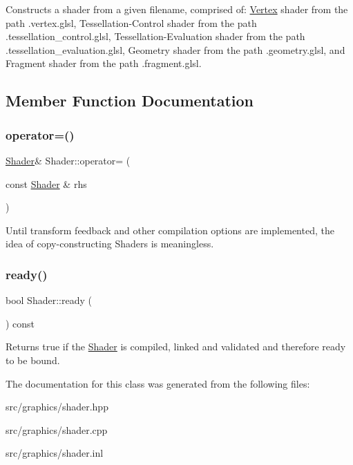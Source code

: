Constructs a shader from a given filename, comprised of\+: \mbox{\hyperlink{class_vertex}{Vertex}} shader from the path \textquotesingle{}.vertex.\+glsl\textquotesingle{}, Tessellation-\/\+Control shader from the path \textquotesingle{}.tessellation\+\_\+control.\+glsl\textquotesingle{}, Tessellation-\/\+Evaluation shader from the path \textquotesingle{}.tessellation\+\_\+evaluation.\+glsl\textquotesingle{}, Geometry shader from the path \textquotesingle{}.geometry.\+glsl\textquotesingle{}, and Fragment shader from the path \textquotesingle{}.fragment.\+glsl\textquotesingle{}. 

\subsection{Member Function Documentation}
\mbox{\label{class_shader_a4aa4dab7fa6e0cb0dd12df61b471e6f0}} 
\subsubsection{\texorpdfstring{operator=()}{operator=()}}
{\footnotesize\ttfamily \mbox{\hyperlink{class_shader}{Shader}}\& Shader\+::operator= (\begin{DoxyParamCaption}\item[{const \mbox{\hyperlink{class_shader}{Shader}} \&}]{rhs }\end{DoxyParamCaption})\hspace{0.3cm}{\ttfamily [delete]}}

Until transform feedback and other compilation options are implemented, the idea of copy-\/constructing Shaders is meaningless. \mbox{\label{class_shader_a8053fc5d01642d3d985e233835065e13}} 
\subsubsection{\texorpdfstring{ready()}{ready()}}
{\footnotesize\ttfamily bool Shader\+::ready (\begin{DoxyParamCaption}{ }\end{DoxyParamCaption}) const}

Returns true if the \mbox{\hyperlink{class_shader}{Shader}} is compiled, linked and validated and therefore ready to be bound. 

The documentation for this class was generated from the following files\+:\begin{DoxyCompactItemize}
\item 
src/graphics/shader.\+hpp\item 
src/graphics/shader.\+cpp\item 
src/graphics/shader.\+inl\end{DoxyCompactItemize}
